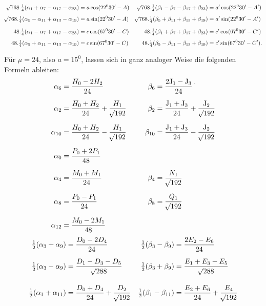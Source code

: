 \begin{landscape}
\[\begin{aligned}
\mathord{{}^{}\!\surd}768\mathord{.}\tfrac14(\alpha_1+\alpha_7-\alpha_{17}-\alpha_{23})&=a\cos(22^0 30'-A)&\mathord{{}^{}\!\surd}768\mathord{.}\tfrac14(\beta_1-\beta_7-\beta_{17}+\beta_{23})&=a'\cos(22^0 30'-A')\\[4pt]
\mathord{{}^{}\!\surd}768\mathord{.}\tfrac14(\alpha_5-\alpha_{11}+\alpha_{13}-\alpha_{19})&=a\sin(22^0 30'-A)&\mathord{{}^{}\!\surd}768\mathord{.}\tfrac14(\beta_5+\beta_{11}+\beta_{13}+\beta_{19})&=a'\sin(22^0 30'-A')\\[6pt]
48\mathord{.}\tfrac14(\alpha_1-\alpha_7+\alpha_{17}-\alpha_{23})&=c\cos(67^0 30'-C)&48\mathord{.}\tfrac14(\beta_1+\beta_7+\beta_{17}+\beta_{23})&=c'\cos(67^0 30'-C')\\[4pt]
48\mathord{.}\tfrac14(\alpha_5+\alpha_{11}-\alpha_{13}-\alpha_{19})&=c\sin(67^0 30'-C)&48\mathord{.}\tfrac14(\beta_5-\beta_{11}-\beta_{13}+\beta_{19})&=c'\sin(67^0 30'-C').
\end{aligned}
\]
\par\noindent\hspace*{\parindent}Für \(\mu=24\), also \(a=15^0\), lassen sich in ganz analoger Weise die folgenden Formeln ableiten:
\[
\begin{aligned}
\alpha_6&=\frac{H_0-2H_2}{24}&\qquad\beta_6&=\frac{2\mathrm{J}_1-\mathrm{J}_3}{24}\VthreeUpperMark\\[6pt]
\alpha_2&=\frac{H_0+H_2}{24}+\frac{H_1}{\BareRoot{192}}&\beta_2&=\frac{\mathrm{J}_1+\mathrm{J}_3}{24}+\frac{\mathrm{J}_2}{\BareRoot{192}}\\[6pt]
\alpha_{10}&=\frac{H_0+H_2}{24}-\frac{H_1}{\BareRoot{192}}&\beta_{10}&=\frac{\mathrm{J}_1+\mathrm{J}_3}{24}-\frac{\mathrm{J}_2}{\BareRoot{192}}\\[6pt]
\alpha_0&=\frac{P_0+2P_1}{48}&&\\[6pt]
\alpha_4&=\frac{M_0+M_1}{24}&\beta_4&=\frac{N_1}{\BareRoot{192}}\\[6pt]
\alpha_8&=\frac{P_0-P_1}{24}&\beta_8&=\frac{Q_1}{\BareRoot{192}}\\[6pt]
\alpha_{12}&=\frac{M_0-2M_1}{48}&&
\end{aligned}
\]
\clearpage
\[
\begin{aligned}
\tfrac12(\alpha_3+\alpha_9)&=\frac{D_0-2D_4}{24}&\tfrac12(\beta_3-\beta_9)&=\frac{2E_2-E_6}{24}\\[6pt]
\tfrac12(\alpha_3-\alpha_9)&=\frac{D_1-D_3-D_5}{\BareRoot{288}}&\tfrac12(\beta_3+\beta_9)&=\frac{E_1+E_3-E_5}{\BareRoot{288}}\\[10pt]
\tfrac12(\alpha_1+\alpha_{11})&=\frac{D_0+D_4}{24}+\frac{D_2}{\BareRoot{192}}&\tfrac12(\beta_1-\beta_{11})&=\frac{E_2+E_6}{24}+\frac{E_4}{\BareRoot{192}}\\[6pt]

\end{aligned}\]
\end{landscape}
